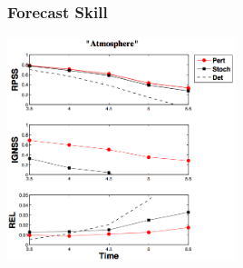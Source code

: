 \documentclass[graphics]{beamer}
\begin{document}
\begin{frame}
   \frametitle{Forecast Skill}
   \includegraphics[width=0.5\textwidth, height=0.65\textwidth]{timeseries_eclim_stoch_det_std00_lev8_40pt_meanao_exp1_atm.png}
\end{frame}
\end{document}
